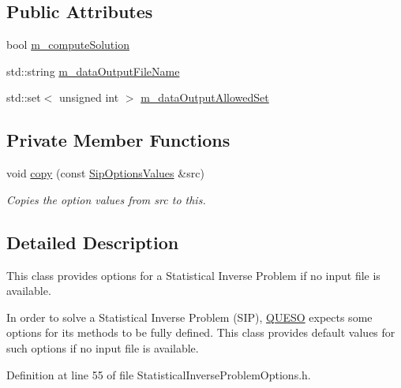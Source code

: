 \subsection*{Public Attributes}
\begin{DoxyCompactItemize}
\item 
bool \hyperlink{class_q_u_e_s_o_1_1_sip_options_values_a3ad6bcf891e7d938cc41ac47af698ab9}{m\-\_\-compute\-Solution}
\item 
std\-::string \hyperlink{class_q_u_e_s_o_1_1_sip_options_values_a5b68edcbfca8473657ee8d58cfc16fb6}{m\-\_\-data\-Output\-File\-Name}
\item 
std\-::set$<$ unsigned int $>$ \hyperlink{class_q_u_e_s_o_1_1_sip_options_values_abda641263b3f677da5078fb3ea3f7102}{m\-\_\-data\-Output\-Allowed\-Set}
\end{DoxyCompactItemize}
\subsection*{Private Member Functions}
\begin{DoxyCompactItemize}
\item 
void \hyperlink{class_q_u_e_s_o_1_1_sip_options_values_a82009a049ab5e41592e33646bcf5c857}{copy} (const \hyperlink{class_q_u_e_s_o_1_1_sip_options_values}{Sip\-Options\-Values} \&src)
\begin{DoxyCompactList}\small\item\em Copies the option values from {\ttfamily src} to {\ttfamily this}. \end{DoxyCompactList}\end{DoxyCompactItemize}


\subsection{Detailed Description}
This class provides options for a Statistical Inverse Problem if no input file is available. 

In order to solve a Statistical Inverse Problem (S\-I\-P), \hyperlink{namespace_q_u_e_s_o}{Q\-U\-E\-S\-O} expects some options for its methods to be fully defined. This class provides default values for such options if no input file is available. 

Definition at line 55 of file Statistical\-Inverse\-Problem\-Options.\-h.



